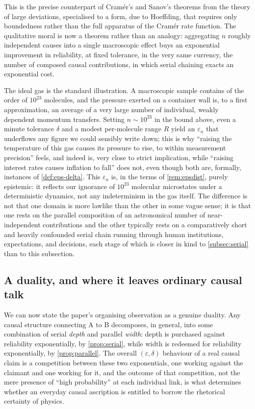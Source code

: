 \documentclass[11pt]{article}
\theoremstyle{definition}
\newcommand{\eps}{\varepsilon}
\begin{document}
This is the precise counterpart of Cram\'er's and Sanov's theorems from the theory of large deviations, specialised to a form, due to Hoeffding, that requires only boundedness rather than the full apparatus of the Cram\'er rate function. The qualitative moral is now a theorem rather than an analogy: aggregating $n$ roughly independent causes into a single macroscopic effect buys an exponential improvement in reliability, at fixed tolerance, in the very same currency, the number of composed causal contributions, in which serial chaining exacts an exponential cost.

The ideal gas is the standard illustration. A macroscopic sample contains of the order of $10^{23}$ molecules, and the pressure exerted on a container wall is, to a first approximation, an average of a very large number of individual, weakly dependent momentum transfers. Setting $n\sim10^{23}$ in the bound above, even a minute tolerance $\delta$ and a modest per-molecule range $R$ yield an $\eps_n$ that underflows any figure we could sensibly write down; this is why ``raising the temperature of this gas causes its pressure to rise, to within measurement precision'' feels, and indeed is, very close to strict implication, while ``raising interest rates causes inflation to fall'' does not, even though both are, formally, instances of \cref{def:eps-delta}. This $\eps_n$ is, in the terms of \cref{rem:epsdist}, purely epistemic: it reflects our ignorance of $10^{23}$ molecular microstates under a deterministic dynamics, not any indeterminism in the gas itself. The difference is not that one domain is more lawlike than the other in some vague sense; it is that one rests on the parallel composition of an astronomical number of near-independent contributions and the other typically rests on a comparatively short and heavily confounded serial chain running through human institutions, expectations, and decisions, each stage of which is closer in kind to \cref{subsec:serial} than to this subsection.

\subsection{A duality, and where it leaves ordinary causal talk}
\label{subsec:duality}

We can now state the paper's organising observation as a genuine duality. Any causal structure connecting A to B decomposes, in general, into some combination of serial \emph{depth} and parallel \emph{width}: depth is purchased against reliability exponentially, by \cref{prop:serial}, while width is redeemed for reliability exponentially, by \cref{prop:parallel}. The overall $(\eps,\delta)$ behaviour of a real causal claim is a competition between these two exponentials, one working against the claimant and one working for it, and the outcome of that competition, not the mere presence of ``high probability'' at each individual link, is what determines whether an everyday causal ascription is entitled to borrow the rhetorical certainty of physics.
\end{document}
